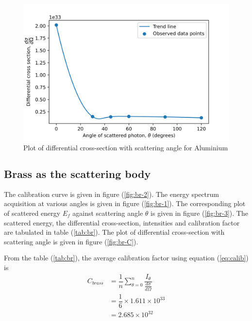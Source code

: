 \documentclass[%
 reprint,
nofootinbib,
 amsmath,amssymb,
 aps,
floatfix,
]{revtex4-2}
\begin{document}
    \begin{figure}
        \centering
        \includegraphics[scale = 0.56]{Figures/plot-al-C.png}
        \caption{Plot of differential cross-section with scattering angle for Aluminium}
        \label{fig:al-C}
    \end{figure}
    
    \subsection{Brass as the scattering body}
    The calibration curve is given in figure (\ref{fig:br-2}). The energy spectrum acquisition at various angles is given in figure (\ref{fig:br-1}). The corresponding plot of scattered energy $E_f$ against scattering angle $\theta$ is given in figure (\ref{fig:br-3}). The scattered energy, the differential cross-section, intensities and calibration factor are tabulated in table (\ref{tab:br}). The plot of differential cross-section with scattering angle is given in figure (\ref{fig:br-C}).
    \par
    From the table (\ref{tab:br}), the average calibration factor using equation (\ref{eq:calib}) is
    \begin{equation}
        \begin{split}
            C_{brass} &= \dfrac{1}{n} \sum_{\theta = 0}^{n} \dfrac{I_{\theta}}{\frac{d \sigma}{d \Omega}} \\
            &= \dfrac{1}{6} \times 1.611 \times 10^{33} \\
            &= \boxed{2.685 \times 10^{32}}
        \end{split}
    \end{equation}
    
\end{document}
